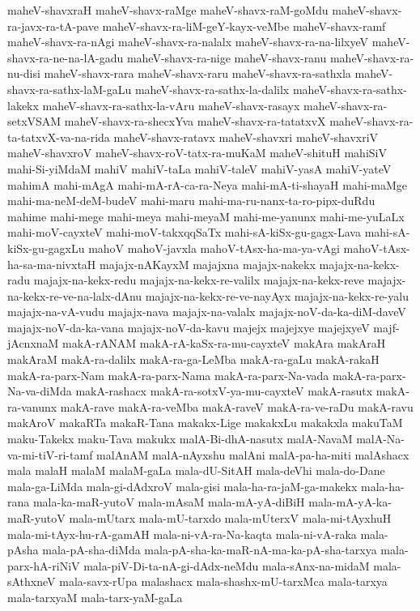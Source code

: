 {maheV-shavxraH
maheV-shavx-raMge
maheV-shavx-raM-goMdu
maheV-shavx-ra-javx-ra-tA-pave
maheV-shavx-ra-liM-geY-kayx-veMbe
maheV-shavx-ramf
maheV-shavx-ra-nAgi
maheV-shavx-ra-nalalx
maheV-shavx-ra-na-lilxyeV
maheV-shavx-ra-ne-na-lA-gadu
maheV-shavx-ra-nige
maheV-shavx-ranu
maheV-shavx-ra-nu-disi
maheV-shavx-rara
maheV-shavx-raru
maheV-shavx-ra-sathxla
maheV-shavx-ra-sathx-laM-gaLu
maheV-shavx-ra-sathx-la-dalilx
maheV-shavx-ra-sathx-lakekx
maheV-shavx-ra-sathx-la-vAru
maheV-shavx-rasayx
maheV-shavx-ra-setxVSAM
maheV-shavx-ra-shecxYva
maheV-shavx-ra-tatatxvX
maheV-shavx-ra-ta-tatxvX-va-na-rida
maheV-shavx-ratavx
maheV-shavxri
maheV-shavxriV
maheV-shavxroV
maheV-shavx-roV-tatx-ra-muKaM
maheV-shituH
mahiSiV
mahi-Si-yiMdaM
mahiV
mahiV-taLa
mahiV-taleV
mahiV-yasA
mahiV-yateV
mahimA
mahi-mAgA
mahi-mA-rA-ca-ra-Neya
mahi-mA-ti-shayaH
mahi-maMge
mahi-ma-neM-deM-budeV
mahi-maru
mahi-ma-ru-nanx-ta-ro-pipx-duRdu
mahime
mahi-mege
mahi-meya
mahi-meyaM
mahi-me-yanunx
mahi-me-yuLaLx
mahi-moV-cayxteV
mahi-moV-takxqqSaTx
mahi-sA-kiSx-gu-gagx-Lava
mahi-sA-kiSx-gu-gagxLu
mahoV
mahoV-javxla
mahoV-tAsx-ha-ma-ya-vAgi
mahoV-tAsx-ha-sa-ma-nivxtaH
majajx-nAKayxM
majajxna
majajx-nakekx
majajx-na-kekx-radu
majajx-na-kekx-redu
majajx-na-kekx-re-valilx
majajx-na-kekx-reve
majajx-na-kekx-re-ve-na-lalx-dAnu
majajx-na-kekx-re-ve-nayAyx
majajx-na-kekx-re-yalu
majajx-na-vA-vudu
majajx-nava
majajx-na-valalx
majajx-noV-da-ka-diM-daveV
majajx-noV-da-ka-vana
majajx-noV-da-kavu
majejx
majejxye
majejxyeV
majf-jAcnxnaM
makA-rANAM
makA-rA-kaSx-ra-mu-cayxteV
makAra
makAraH
makAraM
makA-ra-dalilx
makA-ra-ga-LeMba
makA-ra-gaLu
makA-rakaH
makA-ra-parx-Nam
makA-ra-parx-Nama
makA-ra-parx-Na-vada
makA-ra-parx-Na-va-diMda
makA-rashacx
makA-ra-sotxV-ya-mu-cayxteV
makA-rasutx
makA-ra-vanunx
makA-rave
makA-ra-veMba
makA-raveV
makA-ra-ve-raDu
makA-ravu
makAroV
makaRTa
makaR-Tana
makakx-Lige
makakxLu
makakxla
makuTaM
maku-Takekx
maku-Tava
makukx
malA-Bi-dhA-nasutx
malA-NavaM
malA-Na-va-mi-tiV-ri-tamf
malAnAM
malA-nAyxshu
malAni
malA-pa-ha-miti
malAshacx
mala
malaH
malaM
malaM-gaLa
mala-dU-SitAH
mala-deVhi
mala-do-Dane
mala-ga-LiMda
mala-gi-dAdxroV
mala-gisi
mala-ha-ra-jaM-ga-makekx
mala-ha-rana
mala-ka-maR-yutoV
mala-mAsaM
mala-mA-yA-diBiH
mala-mA-yA-ka-maR-yutoV
mala-mUtarx
mala-mU-tarxdo
mala-mUterxV
mala-mi-tAyxhuH
mala-mi-tAyx-hu-rA-gamAH
mala-ni-vA-ra-Na-kaqta
mala-ni-vA-raka
mala-pAsha
mala-pA-sha-diMda
mala-pA-sha-ka-maR-nA-ma-ka-pA-sha-tarxya
mala-parx-hA-riNiV
mala-piV-Di-ta-nA-gi-dAdx-neMdu
mala-sAnx-na-midaM
mala-sAthxneV
mala-savx-rUpa
malashacx
mala-shashx-mU-tarxMca
mala-tarxya
mala-tarxyaM
mala-tarx-yaM-gaLa
}
